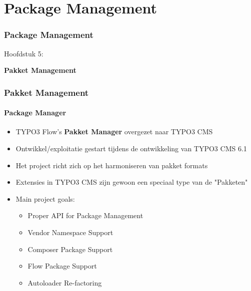 %

\section{Package Management}
\begin{frame}[fragile]
	\frametitle{Package Management}

	\begin{center}\huge{Hoofdstuk 5:}\end{center}
	\begin{center}\huge{\color{typo3darkgrey}\textbf{Pakket Management}}\end{center}

\end{frame}


\begin{frame}[fragile]
	\frametitle{Pakket Management}
	\framesubtitle{Package Manager}

	\begin{itemize}
		\item TYPO3 Flow's \textbf{Pakket Manager} overgezet naar TYPO3 CMS
		\item Ontwikkel/exploitatie gestart tijdens de ontwikkeling van TYPO3 CMS 6.1
		\item Het project richt zich op het harmoniseren van pakket formats
		\item Extensies in TYPO3 CMS zijn gewoon een speciaal type van de "Pakketen"
		\item Main project goals:

			\begin{itemize}
				\item Proper API for Package Management
				\item Vendor Namespace Support
				\item Composer Package Support
				\item Flow Package Support
				\item Autoloader Re-factoring
			\end{itemize}

	\end{itemize}

\end{frame}

